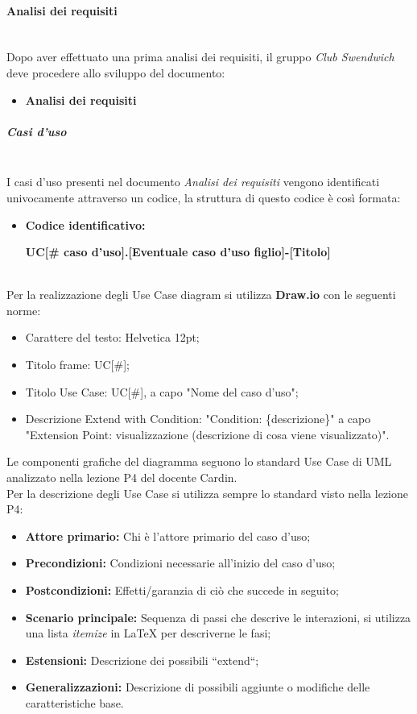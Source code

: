 \paragraph{Analisi dei requisiti}
\mbox{} \\
Dopo aver effettuato una prima analisi dei requisiti, il gruppo \textit{Club Swendwich}
deve procedere allo sviluppo del documento:
\begin{itemize}
    \item \textbf{Analisi dei requisiti}
\end{itemize}

\subparagraph{Casi d'uso}
\mbox{} \\
I casi d'uso presenti nel documento \textit{Analisi dei requisiti} vengono identificati univocamente attraverso un codice, la struttura di questo codice è così formata:
\begin{itemize}
    \item   \textbf{Codice identificativo:}
            \par \centerline{\textbf{UC[\# caso d'uso].[Eventuale caso d'uso figlio]-[Titolo]}}
\end{itemize}
\mbox{} \\
Per la realizzazione degli Use Case diagram si utilizza \textbf{Draw.io} con le seguenti norme:
\begin{itemize}
\item Carattere del testo: Helvetica 12pt;
\item Titolo frame: UC[\#];
\item Titolo Use Case: UC[\#], a capo "Nome del caso d'uso";
\item Descrizione Extend with Condition: "Condition: \{descrizione\}" a capo "Extension Point: visualizzazione (descrizione di cosa viene visualizzato)".
\end{itemize}
Le componenti grafiche del diagramma seguono lo standard Use Case di UML analizzato nella lezione P4 del docente Cardin. \\

\noindent Per la descrizione degli Use Case si utilizza sempre lo standard visto nella lezione P4:
\begin{itemize}
	\item \textbf{Attore primario:} Chi è l'attore primario del caso d'uso;
	\item \textbf{Precondizioni:} Condizioni necessarie all'inizio del caso d'uso;
	\item \textbf{Postcondizioni:} Effetti/garanzia di ciò che succede in seguito;
	\item \textbf{Scenario principale:} Sequenza di passi che descrive le interazioni, si utilizza una lista \textit{itemize} in LaTeX per descriverne le fasi;
	\item \textbf{Estensioni:} Descrizione dei possibili ``extend``;
	\item \textbf{Generalizzazioni:} Descrizione di possibili aggiunte o modifiche delle caratteristiche base.
\end{itemize}


